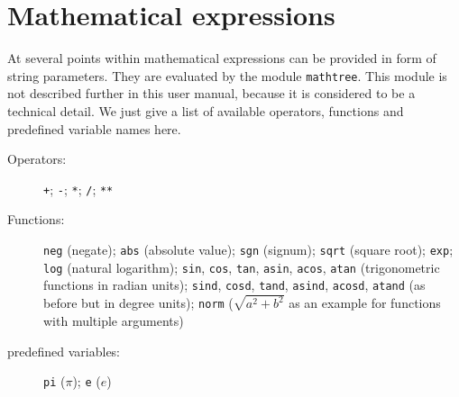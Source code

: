 \chapter{Mathematical expressions}
\label{mathtree}

At several points within \PyX{} mathematical expressions can be
provided in form of string parameters. They are evaluated by the
module \verb|mathtree|. This module is not described further in this
user manual, because it is considered to be a technical detail. We
just give a list of available operators, functions and predefined
variable names here.

\begin{description}
\item[Operators:]
\verb|+|; \verb|-|; \verb|*|; \verb|/|; \verb|**|
\item[Functions:]
\verb|neg| (negate); \verb|abs| (absolute value); \verb|sgn| (signum);
\verb|sqrt| (square root); \verb|exp|; \verb|log| (natural logarithm);
\verb|sin|, \verb|cos|, \verb|tan|, \verb|asin|, \verb|acos|,
\verb|atan| (trigonometric functions in radian units); \verb|sind|,
\verb|cosd|, \verb|tand|, \verb|asind|, \verb|acosd|, \verb|atand| (as
before but in degree units); \verb|norm| ($\sqrt{a^2+b^2}$ as an
example for functions with multiple arguments)
\item[predefined variables:]
\verb|pi| ($\pi$); \verb|e| ($e$)
\end{description}
